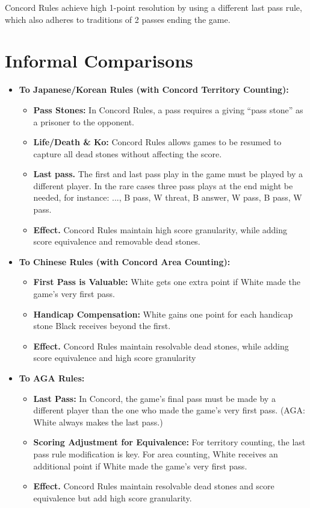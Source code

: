 \documentclass[11pt]{article}
\begin{document}
Concord Rules achieve high 1-point resolution by using a different last pass rule, which also adheres to traditions of 2 passes ending the game.

\newpage

\section{Informal Comparisons}

\begin{itemize}
\item \textbf{To Japanese/Korean Rules (with Concord Territory Counting):}
    \begin{itemize}
    \item \textbf{Pass Stones:} In Concord Rules, a pass requires a giving ``pass stone'' as a prisoner to the opponent.
    \item \textbf{Life/Death \& Ko:} Concord Rules allows games to be resumed to capture all dead stones without affecting the score.
    \item \textbf{Last pass.} The first and last pass play in the game must be played by a different player.
    In the rare cases three pass plays at the end might be needed, for instance: ..., B pass, W threat, B answer, W pass, B pass, W pass.
    \item \textbf{Effect.} Concord Rules maintain high score granularity, while adding score equivalence and removable dead stones.
    \end{itemize}

\item \textbf{To Chinese Rules (with Concord Area Counting):}
    \begin{itemize}
    \item \textbf{First Pass is Valuable:} White gets one extra point if White made the game's very first pass.
    \item \textbf{Handicap Compensation:} White gains one point for each handicap stone Black receives beyond the first.
    \item \textbf{Effect.} Concord Rules maintain resolvable dead stones, while adding score equivalence and high score granularity
    \end{itemize}

\item \textbf{To AGA Rules:}
    \begin{itemize}
    \item \textbf{Last Pass:} In Concord, the game's final pass must be made by a different player than the one who made the game's very first pass.
    (AGA: White always makes the last pass.)
    \item \textbf{Scoring Adjustment for Equivalence:} For territory counting, the last pass rule modification is key.
    For area counting, White receives an additional point if White made the game's very first pass.
    \item \textbf{Effect.} Concord Rules maintain resolvable dead stones and score equivalence but add high score granularity.
    \end{itemize}
\end{itemize}
\end{document}
